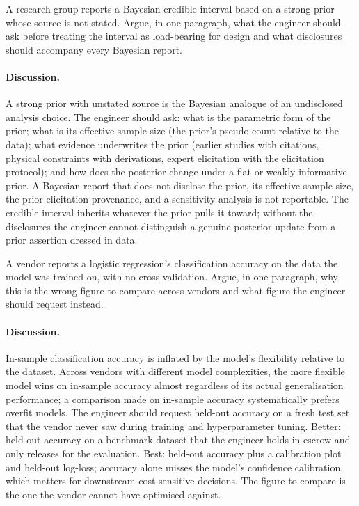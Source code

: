 \begin{exercise}
A research group reports a Bayesian credible interval based on a
strong prior whose source is not stated. Argue, in one paragraph,
what the engineer should ask before treating the interval as
load-bearing for design and what disclosures should accompany
every Bayesian report.

\paragraph{Discussion.} A strong prior with unstated source is
the Bayesian analogue of an undisclosed analysis choice. The
engineer should ask: what is the parametric form of the prior;
what is its effective sample size (the prior's pseudo-count
relative to the data); what evidence underwrites the prior
(earlier studies with citations, physical constraints with
derivations, expert elicitation with the elicitation protocol);
and how does the posterior change under a flat or weakly
informative prior. A Bayesian report that does not disclose the
prior, its effective sample size, the prior-elicitation
provenance, and a sensitivity analysis is not reportable. The
credible interval inherits whatever the prior pulls it toward;
without the disclosures the engineer cannot distinguish a
genuine posterior update from a prior assertion dressed in
data.
\end{exercise}

\begin{exercise}
A vendor reports a logistic regression's classification accuracy
on the data the model was trained on, with no cross-validation.
Argue, in one paragraph, why this is the wrong figure to compare
across vendors and what figure the engineer should request
instead.

\paragraph{Discussion.} In-sample classification accuracy is
inflated by the model's flexibility relative to the dataset.
Across vendors with different model complexities, the more
flexible model wins on in-sample accuracy almost regardless of
its actual generalisation performance; a comparison made on
in-sample accuracy systematically prefers overfit models. The
engineer should request held-out accuracy on a fresh test set
that the vendor never saw during training and hyperparameter
tuning. Better: held-out accuracy on a benchmark dataset that
the engineer holds in escrow and only releases for the
evaluation. Best: held-out accuracy plus a calibration plot and
held-out log-loss; accuracy alone misses the model's confidence
calibration, which matters for downstream cost-sensitive
decisions. The figure to compare is the one the vendor cannot
have optimised against.
\end{exercise}

